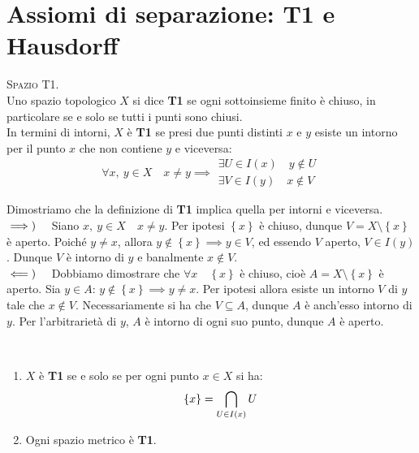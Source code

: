 \section{Assiomi di separazione: T1 e Hausdorff}
\begin{define}\textsc{Spazio T1.}\label{T1}\\
Uno spazio topologico $X$ si dice \textbf{T1} se ogni sottoinsieme finito è chiuso, in particolare se e solo se tutti i punti sono chiusi.\\
In termini di intorni, $X$ è \textbf{T1} se presi due punti distinti $x$ e $y$ esiste un intorno per il punto $x$ che non contiene $y$ e viceversa:
\begin{equation}
\forall x,\ y\in X\quad x\neq y\implies
\begin{array}{l}
	\exists U\in I\left(x\right)\quad y\notin U\\
	\exists V\in I\left(y\right)\quad x\notin V
\end{array}
\end{equation}
\vspace{-6mm}
\end{define}
\begin{demonstration} Dimostriamo che la definizione di \textbf{T1} implica quella per intorni e viceversa.\\
$\implies)\quad$ Siano $x,\ y\in X\quad x\neq y$. Per ipotesi $\left\{x\right\}$ è chiuso, dunque $V=X\setminus\left\{x\right\}$ è aperto. Poiché $y\neq x$, allora $y\notin\left\{x\right\}\implies y\in V$, ed essendo $V$ aperto, $V\in I\left(y\right)$. Dunque $V$ è intorno di $y$ e banalmente $x\notin V$.\\
$\impliedby)\quad$ Dobbiamo dimostrare che $\forall x\quad \left\{x\right\}$ è chiuso, cioè $A=X\setminus\left\{x\right\}$ è aperto. Sia $y\in A$: $y\notin \left\{x\right\}\implies y\neq x$. Per ipotesi allora esiste un intorno $V$ di $y$ tale che $x\notin V$. Necessariamente si ha che $V\subseteq A$, dunque $A$ è anch'esso intorno di $y$. Per l'arbitrarietà di $y$, $A$ è intorno di ogni suo punto, dunque $A$ è aperto.
\end{demonstration}
\begin{observes}~{}
\begin{enumerate}
\item $X$ è \textbf{T1} se e solo se per ogni punto $x\in X$ si ha:
\begin{equation}
\left\{x\right\}=\mathop{{\bigcap}}\displaylimits_{U\in I\left(x\right)}U
\end{equation}
\item Ogni spazio metrico è \textbf{T1}.
\end{enumerate}
\vspace{-3mm}
\end{observes}
